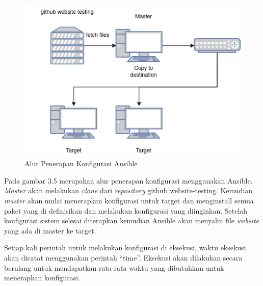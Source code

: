 \documentclass[10pt,]{report}
\begin{document}
\begin{adjustwidth}{20pt}{}
	\begin{figure}[H]
		\centering
		\includegraphics[width=\textwidth]{images/Topologi-Ansible.png}
		\caption{Alur Penerapan Konfigurasi Ansible}
	\end{figure}
	Pada gambar 3.5 merupakan alur penerapan konfigurasi menggunakan Ansible.
	\textit{Master} akan melakukan \textit{clone} dari \textit{repository} github
	website-testing. Kemudian \textit{master} akan mulai menerapkan konfigurasi
	untuk target dan menginstall semua paket yang di definisikan dan melakukan
	konfigurasi yang diinginkan. Setelah konfigurasi sistem selesai diterapkan
	kemudian Ansible akan menyalin file \textit{website} yang ada di master ke
	target.

	Setiap kali perintah untuk melakukan konfigurasi di eksekusi, waktu eksekusi
	akan dicatat menggunakan perintah “time”. Eksekusi akan dilakukan secara
	berulang untuk mendapatkan rata-rata waktu yang dibutuhkan untuk menerapkan
	konfigurasi.\\
\end{adjustwidth}
\end{document}
